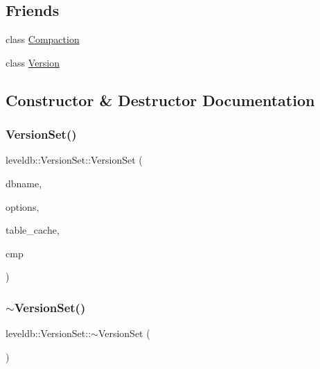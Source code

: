 \subsection*{Friends}
\begin{DoxyCompactItemize}
\item 
class \mbox{\hyperlink{classleveldb_1_1_version_set_a9372e882b35d27c78356228e4b758917}{Compaction}}
\item 
class \mbox{\hyperlink{classleveldb_1_1_version_set_ace162f32d4abb584945d3a55a389b0a3}{Version}}
\end{DoxyCompactItemize}


\subsection{Constructor \& Destructor Documentation}
\mbox{\label{classleveldb_1_1_version_set_a9e57cec002caced94f5355bb705bd52d}} 
\subsubsection{\texorpdfstring{VersionSet()}{VersionSet()}}
{\footnotesize\ttfamily leveldb\+::\+Version\+Set\+::\+Version\+Set (\begin{DoxyParamCaption}\item[{const std\+::string \&}]{dbname,  }\item[{const \mbox{\hyperlink{structleveldb_1_1_options}{Options}} $\ast$}]{options,  }\item[{\mbox{\hyperlink{classleveldb_1_1_table_cache}{Table\+Cache}} $\ast$}]{table\+\_\+cache,  }\item[{const \mbox{\hyperlink{classleveldb_1_1_internal_key_comparator}{Internal\+Key\+Comparator}} $\ast$}]{cmp }\end{DoxyParamCaption})}

\mbox{\label{classleveldb_1_1_version_set_a53a424c5bb7699808193f150e3432e92}} 
\subsubsection{\texorpdfstring{$\sim$VersionSet()}{~VersionSet()}}
{\footnotesize\ttfamily leveldb\+::\+Version\+Set\+::$\sim$\+Version\+Set (\begin{DoxyParamCaption}{ }\end{DoxyParamCaption})}

